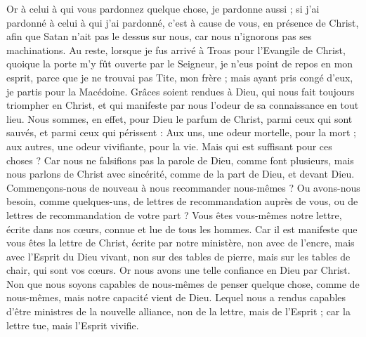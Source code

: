 \begin{multicols}{2}
Or à celui à qui vous pardonnez quelque chose, je pardonne aussi ; si j’ai pardonné à celui à qui j'ai pardonné, c’est à cause de vous, en présence de Christ,
afin que Satan n'ait pas le dessus sur nous, car nous n'ignorons pas ses machinations.
Au reste, lorsque je fus arrivé à Troas pour l'Evangile de Christ, quoique la porte m'y fût ouverte par le Seigneur, je n’eus point de repos en mon esprit, parce que je ne trouvai pas Tite, mon frère ;
mais ayant pris congé d'eux, je partis pour la Macédoine.
Grâces soient rendues à Dieu, qui nous fait toujours triompher en Christ, et qui manifeste par nous l'odeur de sa connaissance en tout lieu.
Nous sommes, en effet, pour Dieu le parfum de Christ, parmi ceux qui sont sauvés, et parmi ceux qui périssent :
Aux uns, une odeur mortelle, pour la mort ; aux autres, une odeur vivifiante, pour la vie. Mais qui est suffisant pour ces choses ?
Car nous ne falsifions pas la parole de Dieu, comme font plusieurs, mais nous parlons de Christ avec sincérité, comme de la part de Dieu, et devant Dieu.
\VerseOne{}Commençons-nous de nouveau à nous recommander nous-mêmes ? Ou avons-nous besoin, comme quelques-uns, de lettres de recommandation auprès de vous, ou de lettres de recommandation de votre part ?
Vous êtes vous-mêmes notre lettre, écrite dans nos cœurs, connue et lue de tous les hommes.
Car il est manifeste que vous êtes la lettre de Christ, écrite par notre ministère, non avec de l'encre, mais avec l'Esprit du Dieu vivant, non sur des tables de pierre, mais sur les tables de chair, qui sont vos cœurs.
Or nous avons une telle confiance en Dieu par Christ.
Non que nous soyons capables de nous-mêmes de penser quelque chose, comme de nous-mêmes, mais notre capacité vient de Dieu.
Lequel nous a rendus capables d'être ministres de la nouvelle alliance, non de la lettre, mais de l'Esprit ; car la lettre tue, mais l'Esprit vivifie.

\end{multicols}
